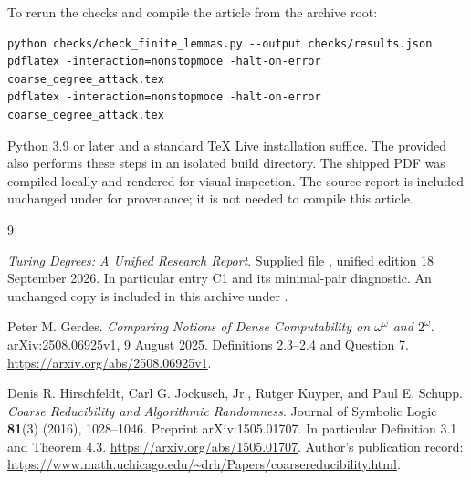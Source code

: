 \documentclass[11pt,a4paper]{article}
\theoremstyle{definition}\newtheorem{definition}[theorem]{Definition}
\theoremstyle{remark}\newtheorem{remark}[theorem]{Remark}
\begin{document}
To rerun the checks and compile the article from the archive root:
\begin{lstlisting}
python checks/check_finite_lemmas.py --output checks/results.json
pdflatex -interaction=nonstopmode -halt-on-error coarse_degree_attack.tex
pdflatex -interaction=nonstopmode -halt-on-error coarse_degree_attack.tex
\end{lstlisting}
Python 3.9 or later and a standard TeX Live installation suffice. The provided
 also performs these steps in an isolated build directory.
The shipped PDF was compiled locally and rendered for visual inspection.
The source report is included unchanged under  for provenance;
it is not needed to compile this article.

\begin{thebibliography}{9}
\emph{Turing Degrees: A Unified Research Report}.
Supplied file , unified edition
18 September 2026. In particular entry C1 and its minimal-pair diagnostic.
An unchanged copy is included in this archive under .

Peter M. Gerdes.
\emph{Comparing Notions of Dense Computability on $\omega^\omega$ and
$2^\omega$}.
arXiv:2508.06925v1, 9 August 2025. Definitions 2.3--2.4 and Question 7.
\url{https://arxiv.org/abs/2508.06925v1}.

Denis R. Hirschfeldt, Carl G. Jockusch, Jr., Rutger Kuyper, and Paul E. Schupp.
\emph{Coarse Reducibility and Algorithmic Randomness}.
Journal of Symbolic Logic \textbf{81}(3) (2016), 1028--1046.
Preprint arXiv:1505.01707. In particular Definition 3.1 and Theorem 4.3.
\url{https://arxiv.org/abs/1505.01707}.
Author's publication record:
\url{https://www.math.uchicago.edu/~drh/Papers/coarsereducibility.html}.
\end{thebibliography}
\end{document}
